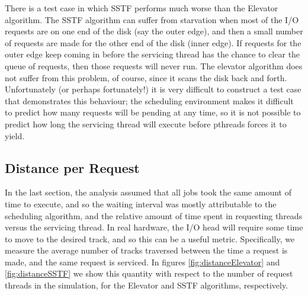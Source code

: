 \documentclass[12pt]{report}
\begin{document}
%
There is a test case in which SSTF performs much worse than the Elevator algorithm. The
SSTF algorithm can suffer from starvation when most of the I/O requests are on one end of
the disk (say the outer edge), and then a small number of requests are made for the other
end of the disk (inner edge). If
requests for the outer edge keep coming in before the servicing thread has the chance to
clear the queue of requests, then those requests will never run. The elevator algorithm
does not suffer from this problem, of course, since it scans the disk back and forth.
Unfortunately (or perhaps fortunately!) it is very difficult to construct a test case that demonstrates this
behaviour; the scheduling environment makes it difficult to predict how many
requests will be pending at any time, so it is not possible to predict how long the servicing
thread will execute before pthreads forces it to yield.

\subsection{Distance per Request}
In the last section, the analysis assumed that all jobs took the same
amount of time to execute, and so the waiting interval was mostly attributable to the scheduling
algorithm, and the relative amount of time spent in requesting threads versus the
servicing thread. In real hardware, the I/O head will require some time to move to the
desired track, and so this can be a useful metric. Specifically, we measure the average
number of tracks traversed between the time a request is made, and the same request is
serviced. In figures \ref{fig:distanceElevator} and \ref{fig:distanceSSTF} we show this 
quantity with respect to the number of request threads in the simulation, for the
Elevator and SSTF algorithms, respectively.
\end{document}

